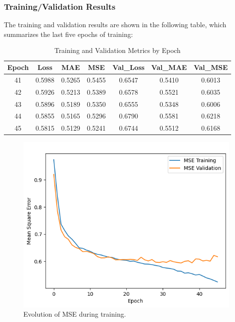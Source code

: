 \documentclass[sigconf,natbib=false]{acmart}
\begin{document}
\subsubsection{Training/Validation Results}

The training and validation results are shown in the following table, which summarizes the last five epochs of training:

\begin{table}
  \caption{Training and Validation Metrics by Epoch}
  \label{tab:train_val_metrics}
  \begin{tabular}{ccccccc}
    \toprule
    Epoch & Loss & MAE & MSE & Val\_Loss & Val\_MAE & Val\_MSE \\
    \midrule
    41 & 0.5988 & 0.5265 & 0.5455 & 0.6547 & 0.5410 & 0.6013 \\
    42 & 0.5926 & 0.5213 & 0.5389 & 0.6578 & 0.5521 & 0.6035 \\
    43 & 0.5896 & 0.5189 & 0.5350 & 0.6555 & 0.5348 & 0.6006 \\
    44 & 0.5855 & 0.5165 & 0.5296 & 0.6790 & 0.5581 & 0.6218 \\
    45 & 0.5815 & 0.5129 & 0.5241 & 0.6744 & 0.5512 & 0.6168 \\
    \bottomrule
  \end{tabular}
\end{table}

\begin{figure}[h]
 \centering
 \includegraphics[width=\linewidth]{figs/mse_evolution.png}
 \caption{Evolution of MSE during training.}
\end{figure}
\end{document}
